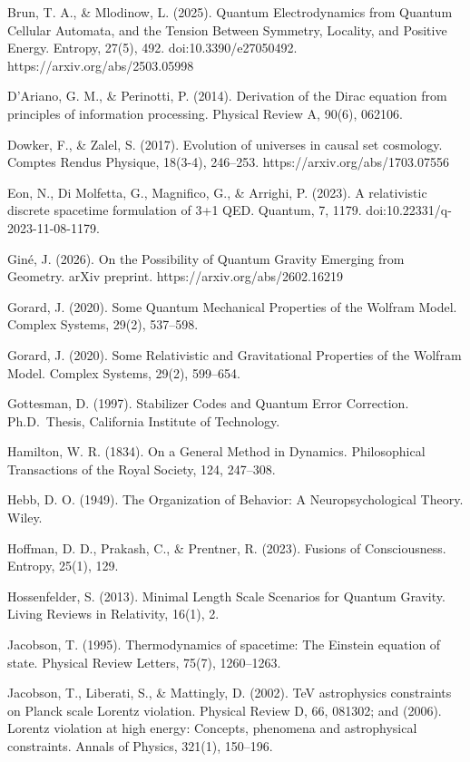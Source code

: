 \documentclass[11pt,oneside]{report}
\theoremstyle{definition}
\theoremstyle{remark}
\newenvironment{reflist}
  {\par\small\setlength{\parindent}{0pt}%
   \setlength{\leftskip}{1.6em}\setlength{\parindent}{-1.6em}%
   \setlength{\parskip}{0.4em}%
   \raggedright\hyphenpenalty=50\exhyphenpenalty=50\relax
   \sloppy}
  {\par}
\begin{document}
\begin{reflist}
Brun, T. A., \& Mlodinow, L. (2025). Quantum Electrodynamics from
Quantum Cellular Automata, and the Tension Between Symmetry, Locality,
and Positive Energy. Entropy, 27(5), 492. doi:10.3390/e27050492.
https://arxiv.org/abs/2503.05998

D'Ariano, G. M., \& Perinotti, P. (2014). Derivation of the Dirac
equation from principles of information processing. Physical Review A,
90(6), 062106.

Dowker, F., \& Zalel, S. (2017). Evolution of universes in causal set
cosmology. Comptes Rendus Physique, 18(3-4), 246--253.
https://arxiv.org/abs/1703.07556

Eon, N., Di Molfetta, G., Magnifico, G., \& Arrighi, P. (2023). A
relativistic discrete spacetime formulation of 3+1 QED. Quantum, 7,
1179. doi:10.22331/q-2023-11-08-1179.

Giné, J. (2026). On the Possibility of Quantum Gravity Emerging from
Geometry. arXiv preprint. https://arxiv.org/abs/2602.16219

Gorard, J. (2020). Some Quantum Mechanical Properties of the Wolfram
Model. Complex Systems, 29(2), 537--598.

Gorard, J. (2020). Some Relativistic and Gravitational Properties of the
Wolfram Model. Complex Systems, 29(2), 599--654.

Gottesman, D. (1997). Stabilizer Codes and Quantum Error Correction.
Ph.D.~Thesis, California Institute of Technology.

Hamilton, W. R. (1834). On a General Method in Dynamics. Philosophical
Transactions of the Royal Society, 124, 247--308.

Hebb, D. O. (1949). The Organization of Behavior: A Neuropsychological
Theory. Wiley.

Hoffman, D. D., Prakash, C., \& Prentner, R. (2023). Fusions of
Consciousness. Entropy, 25(1), 129.

Hossenfelder, S. (2013). Minimal Length Scale Scenarios for Quantum
Gravity. Living Reviews in Relativity, 16(1), 2.

Jacobson, T. (1995). Thermodynamics of spacetime: The Einstein equation
of state. Physical Review Letters, 75(7), 1260--1263.

Jacobson, T., Liberati, S., \& Mattingly, D. (2002). TeV astrophysics
constraints on Planck scale Lorentz violation. Physical Review D, 66,
081302; and (2006). Lorentz violation at high energy: Concepts, phenomena
and astrophysical constraints. Annals of Physics, 321(1), 150--196.


\end{reflist}
\end{document}
